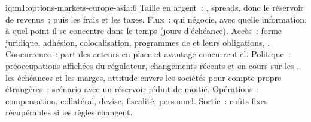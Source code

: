 \begin{solution}{iq:m1:options-markets-europe-asia:6}
Taille en argent~: , spreads, donc le réservoir de revenus~; puis les frais
et les taxes. Flux~: qui négocie, avec quelle information, à quel point il se concentre dans le temps
(jours d'échéance). Accès~: forme juridique, adhésion, colocalisation, programmes de 
et leurs obligations, . Concurrence~: part des acteurs en place
et avantage concurrentiel. Politique~: préoccupations affichées du régulateur, changements récents et en cours
sur les , les échéances et les marges, attitude envers les sociétés pour compte
propre étrangères~; scénario avec un réservoir réduit de moitié. Opérations~: compensation, collatéral,
devise, fiscalité, personnel. Sortie~: coûts fixes récupérables si les règles changent.
\end{solution}
